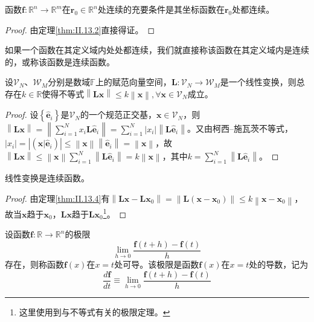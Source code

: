 \documentclass[main.tex]{subfiles}
\begin{document}
\begin{theorem}\label{thm:II.13.3}
函数$\mathbf{f}:\mathbb{R}^n\rightarrow\mathbb{R}^m$在$\mathbf{r}_0\in\mathbb{R}^n$处连续的充要条件是其坐标函数在$\mathbf{r}_0$处都连续。
\end{theorem}
\begin{proof}
由定理\ref{thm:II.13.2}直接得证。
\end{proof}

如果一个函数在其定义域内处处都连续，我们就直接称该函数在其定义域内是连续的，或称该函数是连续函数。

\begin{theorem}\label{thm:II.13.4}
设$\mathcal{V}_N$、$\mathcal{W}_M$分别是数域$\mathbb{F}$上的赋范向量空间，$\mathbf{L}:\mathcal{V}_N\rightarrow\mathcal{W}_M$是一个线性变换，则总存在$k\in\mathbb{R}$使得不等式$\left\|\mathbf{Lx}\right\|\leq k\left\|\mathbf{x}\right\|,\forall\mathbf{x}\in\mathcal{V}_N$成立。
\end{theorem}
\begin{proof}
设$\left\{\mathbf{\hat{e}}_i\right\}$是$\mathcal{V}_N$的一个规范正交基，$\mathbf{x}\in\mathcal{V}_N$，则$\left\|\mathbf{Lx}\right\|=\left\|\sum_{i=1}^Nx_i\mathbf{L}\mathbf{\hat{e}}_i\right\|=\sum_{i=1}^N\left|x_i\right|\left\|\mathbf{L\hat{e}}_i\right\|$。又由柯西--施瓦茨不等式，$\left|x_i\right|=\left|\left(\mathbf{x}|\mathbf{\hat{e}}_i\right)\right|\leq\left\|\mathbf{x}\right\|\left\|\mathbf{\hat{e}}_i\right\|=\left\|\mathbf{x}\right\|$，故$\left\|\mathbf{Lx}\right\|\leq\left\|\mathbf{x}\right\|\sum_{i=1}^N\left\|\mathbf{L\hat{e}}_i\right\|=k\left\|\mathbf{x}\right\|$，其中$k=\sum_{i=1}^N\left\|\mathbf{L\hat{e}}_i\right\|$。
\end{proof}

\begin{corollary}
线性变换是连续函数。
\end{corollary}
\begin{proof}
由定理\ref{thm:II.13.4}有$\left\|\mathbf{Lx}-\mathbf{Lx}_0\right\|=\left\|\mathbf{L}\left(\mathbf{x}-\mathbf{x}_0\right)\right\|\leq k\left\|\mathbf{x}-\mathbf{x}_0\right\|$，故当$\mathbf{x}$趋于$\mathbf{x}_0$，$\mathbf{Lx}$趋于$\mathbf{Lx}_0$\footnote{这里使用到与不等式有关的极限定理。}。
\end{proof}

\begin{definition}[一元向量函数的导数]
设函数$\mathbf{f}:\mathbb{R}\rightarrow\mathbb{R}^n$的极限
\[
\lim_{h\to 0}\frac{\mathbf{f}\left(t+h\right)-\mathbf{f}\left(t\right)}{h}
\]
存在，则称函数$\mathbf{f}\left(x\right)$在$x=t$处可导。该极限是函数$\mathbf{f}\left(x\right)$在$x=t$处的导数，记为
\[
\frac{d\mathbf{f}}{dt}\equiv\lim_{h\to 0}\frac{\mathbf{f}\left(t+h\right)-\mathbf{f}\left(t\right)}{h}
\]
\end{definition}
\end{document}

